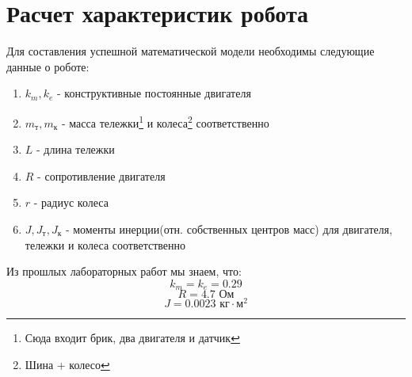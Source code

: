 \documentclass[a4paper]{article}
\begin{document}
\section{Расчет характеристик робота}
\begin{flushleft}
Для составления успешной математической модели необходимы следующие данные о роботе:
\end{flushleft}

\begin{enumerate}
    \item \(k_m, k_e\) - конструктивные постоянные двигателя
    \item \(m_{\text{т}}, m_{\text{к}}\) - масса тележки\footnote{Сюда входит брик, два двигателя и датчик} и колеса\footnote{Шина + колесо} соответственно
    \item \(L\) - длина тележки
    \item \(R\) - сопротивление двигателя
    \item \(r\) - радиус колеса
    \item \(J, J_{\text{т}}, J_{\text{к}}\) - моменты инерции(отн. собственных центров масс) для двигателя, тележки и колеса соответственно
\end{enumerate}

\begin{flushleft}
Из прошлых лабораторных работ мы знаем, что:
    \begin{equation*}
        k_m = k_e = 0.29
    \end{equation*}
    \begin{equation*}
        R = 4.7 \text{ Ом}
    \end{equation*}
    \begin{equation*}
        J = 0.0023 \text{ кг} \cdot \text{м}^2
    \end{equation*}
\end{flushleft}
\end{document}

